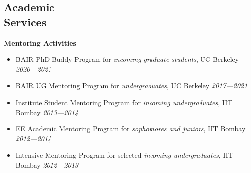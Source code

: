 \documentclass[margin,centered]{res}
\newcommand\quelle[1]{{%
      \unskip\nobreak\hfil\penalty50
      \hskip2em\hbox{}\nobreak\hfil\emph{#1}%
      \parfillskip=0pt \finalhyphendemerits=0 \par}}
\begin{document}
\begin{resume}





\section{\sc Academic \\ Services} 

\textbf{Mentoring Activities}

\begin{itemize}\itemsep0em
  \item BAIR PhD Buddy Program for \emph{incoming graduate
  students}, UC Berkeley
  \hfill{\emph{2020---2021}}
  \item BAIR UG Mentoring Program for \emph{undergraduates}, UC Berkeley
  \hfill{\emph{2017---2021}}
  \item Institute Student Mentoring Program for \emph{incoming undergraduates},
  IIT Bombay
  \hfill{\emph{2013---2014}}
  \item EE Academic Mentoring Program for \emph{sophomores and
  juniors}, IIT Bombay
  \hfill{\emph{2012---2014}}
  \item Intensive Mentoring Program for selected \emph{incoming undergraduates}, IIT Bombay
  \hfill{\emph{2012---2013}}
\end{itemize}


\end{resume}
\end{document}
